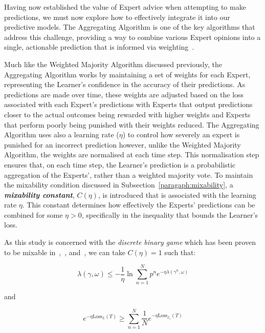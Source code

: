 Having now established the value of Expert advice when attempting to make predictions, we must now explore how to effectively integrate it into our predictive models. The Aggregating Algorithm is one of the key algorithms that address this challenge, providing a way to combine various Expert opinions into a single, actionable prediction that is informed via weighting~\cite{vovk:1990}.

Much like the Weighted Majority Algorithm discussed previously, the Aggregating Algorithm works by maintaining a set of weights for each Expert, representing the Learner's confidence in the accuracy of their predictions. As predictions are made over time, these weights are adjusted based on the loss associated with each Expert's predictions with Experts that output predictions closer to the actual outcomes being rewarded with higher weights and Experts that perform poorly being punished with their weights reduced. The Aggregating Algorithm uses also a learning rate ($\eta$) to control how severely an expert is punished for an incorrect prediction however, unlike the Weighted Majority Algorithm, the weights are normalised at each time step. This normalisation step ensures that, on each time step, the Learner's prediction is a probabilistic aggregation of the Experts', rather than a weighted majority vote. To maintain the mixability condition discussed in Subsection~\ref{paragaph:mixability}, a \textbf{\textit{mixability constant}}, $C(\eta)$, is introduced that is associated with the learning rate $\eta$. This constant determines how effectively the Experts' predictions can be combined for some $\eta > 0$, specifically in the inequality that bounds the Learner's loss.

As this study is concerned with the \textit{discrete binary game} which has been proven to be mixable in~\cite{vovk:2001},~\cite{kalnishkan/vyugin:2008}, and~\cite{kalnishkan:2022}, we can take $C(\eta) = 1$ such that:

\begin{equation}
    \lambda(\gamma,\omega) \leq -\frac{1}{\eta}\ln\underset{n=1}{\overset{N}{\sum}}p^ne^{-\eta\lambda(\gamma^n, \omega)}
\end{equation}

and

\begin{equation}
    e^{-\eta\text{Loss}_L(T)} \geq \underset{n=1}{\overset{N}{\sum}}\frac{1}{N}e^{-\eta\text{Loss}_{\mathcal{E}_i}(T)}
\end{equation}

